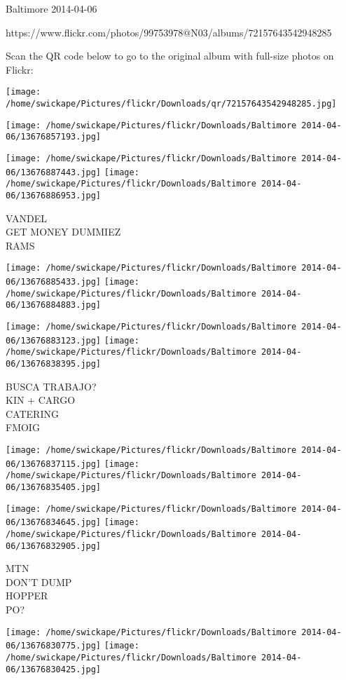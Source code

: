 \documentclass[10pt,letterpaper]{article}
\begin{document}
Baltimore 2014-04-06

https://www.flickr.com/photos/99753978@N03/albums/72157643542948285

Scan the QR code below to go to the original album with full-size photos on Flickr:

\texttt{[image: /home/swickape/Pictures/flickr/Downloads/qr/72157643542948285.jpg]}
\pagebreak

\texttt{[image: /home/swickape/Pictures/flickr/Downloads/Baltimore 2014-04-06/13676857193.jpg]}

\vspace{0.25in}
\texttt{[image: /home/swickape/Pictures/flickr/Downloads/Baltimore 2014-04-06/13676887443.jpg]}
\texttt{[image: /home/swickape/Pictures/flickr/Downloads/Baltimore 2014-04-06/13676886953.jpg]}

VANDEL\\
GET MONEY DUMMIEZ\\
RAMS
\pagebreak

\texttt{[image: /home/swickape/Pictures/flickr/Downloads/Baltimore 2014-04-06/13676885433.jpg]}
\texttt{[image: /home/swickape/Pictures/flickr/Downloads/Baltimore 2014-04-06/13676884883.jpg]}

\texttt{[image: /home/swickape/Pictures/flickr/Downloads/Baltimore 2014-04-06/13676883123.jpg]}
\texttt{[image: /home/swickape/Pictures/flickr/Downloads/Baltimore 2014-04-06/13676838395.jpg]}

BUSCA TRABAJO?\\
KIN + CARGO\\
CATERING\\
FMOIG
\pagebreak

\texttt{[image: /home/swickape/Pictures/flickr/Downloads/Baltimore 2014-04-06/13676837115.jpg]}
\texttt{[image: /home/swickape/Pictures/flickr/Downloads/Baltimore 2014-04-06/13676835405.jpg]}

\texttt{[image: /home/swickape/Pictures/flickr/Downloads/Baltimore 2014-04-06/13676834645.jpg]}
\texttt{[image: /home/swickape/Pictures/flickr/Downloads/Baltimore 2014-04-06/13676832905.jpg]}

MTN\\
DON'T DUMP\\
HOPPER\\
PO?
\pagebreak

\texttt{[image: /home/swickape/Pictures/flickr/Downloads/Baltimore 2014-04-06/13676830775.jpg]}
\texttt{[image: /home/swickape/Pictures/flickr/Downloads/Baltimore 2014-04-06/13676830425.jpg]}
\end{document}

